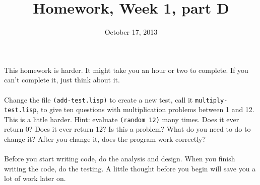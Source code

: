 \documentclass{article}
\title{Homework, Week 1, part D}
\date{October 17, 2013}
\begin{document}
\maketitle{}

\paragraph{}This homework is harder. It might take you an hour or two to complete. If you can't complete it, just think about it.

\paragraph{}Change the file \texttt{(add-test.lisp)} to create a new test, call it \texttt{multiply-test.lisp}, to give ten questions with multiplication problems between 1 and 12. This is a little harder. Hint: evaluate \texttt{(random 12)} many times. Does it ever return 0? Does it ever return 12? Is this a problem? What do you need to do to change it? After you change it, does the program work correctly?

\paragraph{}Before you start writing code, do the analysis and design. When you finish writing the code, do the testing. A little thought before you begin will save you a lot of work later on.
\end{document}
